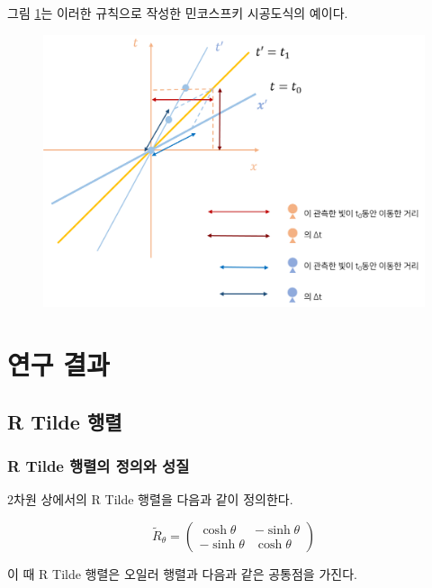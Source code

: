 \documentclass{thesis-SJ}
\begin{document}
그림 \ref{fig:diagram}는 이러한 규칙으로 작성한 민코스프키 시공도식의 예이다.

\begin{figure}[h]
	\centering
	\includegraphics[width=0.5\linewidth]{images/diagram}
	\label{fig:diagram}
\end{figure}

\chapter{연구 결과}
\section{R Tilde 행렬}
\subsection{R Tilde 행렬의 정의와 성질}
$2$차원 상에서의 R Tilde 행렬을 다음과 같이 정의한다.

\begin{equation}
	\tilde{R}_\theta = \begin{pmatrix}
	\cosh \theta & -\sinh \theta \\
	-\sinh \theta & \cosh \theta 
	\end{pmatrix}
\end{equation}

이 때 R Tilde 행렬은 오일러 행렬과 다음과 같은 공통점을 가진다.
\end{document}
